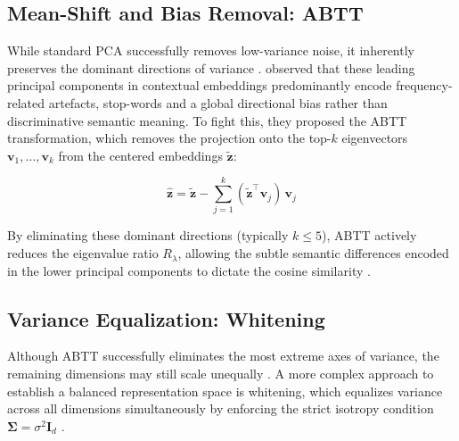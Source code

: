 \subsection{Mean-Shift and Bias Removal: \ac{ABTT}}
\label{sec:theory_abtt}


While standard \ac{PCA} successfully removes low-variance noise, it inherently preserves the dominant directions of variance \citep[p. 317 f.]{deisenroth2020mathematics}. \citet{mu2018allbutthetop} observed that these leading principal components in contextual embeddings predominantly encode frequency-related artefacts, stop-words and a global directional bias rather than discriminative semantic meaning. To fight this, they proposed the \ac{ABTT} transformation, which removes the projection onto the top-$k$ eigenvectors $\mathbf{v}_1, \dots, \mathbf{v}_k$ from the centered embeddings $\tilde{\mathbf{z}}$:

\begin{equation}
    \hat{\mathbf{z}} = \tilde{\mathbf{z}} - \sum_{j=1}^{k} (\tilde{\mathbf{z}}^\top \mathbf{v}_j)\,\mathbf{v}_j
    \label{eq:abtt}
\end{equation}

By eliminating these dominant directions (typically $k \le 5$), \ac{ABTT} actively reduces the eigenvalue ratio $R_\lambda$, allowing the subtle semantic differences encoded in the lower principal components to dictate the cosine similarity \cite{mu2018allbutthetop, Li_2020_Sentence}.

\subsection{Variance Equalization: Whitening}
\label{sec:theory_whitening}

Although \ac{ABTT} successfully eliminates the most extreme axes of variance, the remaining dimensions may still scale unequally \cite{mu2018allbutthetop}. A more complex approach to establish a balanced representation space is whitening, which equalizes variance across all dimensions simultaneously by enforcing the strict isotropy condition $\boldsymbol{\Sigma} = \sigma^2 \mathbf{I}_d$ \cite{su2021whitening, rudman-etal-2022-isoscore, Cai2021IsotropyIT}.

